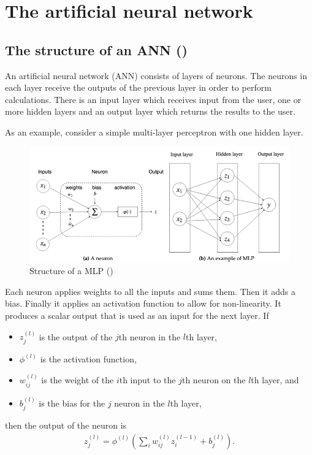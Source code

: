 \documentclass[12pt,a4paper]{article}
\begin{document}
\section{The artificial neural network}
\subsection{The structure of an ANN (\cite{risks7010016})}
An artificial neural network (ANN) consists of layers of neurons. The neurons in each layer receive the outputs of the previous layer in order to perform calculations. There is an input layer which receives input from the user, one or more hidden layers and an output layer which returns the results to the user.

As an example, consider a simple multi-layer perceptron with one hidden layer.
\begin{figure}[H]
    \centering
    \includegraphics[width=430pt]{neuralNetworkDiagram.png}
    \caption{Structure of a MLP (\cite{risks7010016})}
\end{figure}
Each neuron applies weights to all the inputs and sums them. Then it adds a bias. Finally it applies an activation function to allow for non-linearity. It produces a scalar output that is used as an input for the next layer. If 
\begin{itemize}
    \item $z_j^{(l)}$ is the output of the $j$th neuron in the $l$th layer,
    \item $\phi^{(l)}$ is the activation function,
    \item $w_{ij}^{(l)}$ is the weight of the $i$th input to the $j$th neuron on the $l$th layer, and
    \item $b_j^{(l)}$ is the bias for the $j$ neuron in the $l$th layer,
\end{itemize}
then the output of the neuron is
\begin{align}
    z_j^{(l)} = \phi^{(l)}\left( \sum_i w_{ij}^{(l)}z_i^{(l-1)}+b_j^{(l)} \right).
\end{align}
\end{document}
